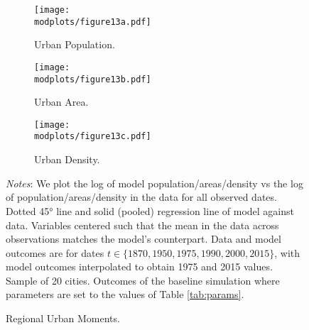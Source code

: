 \documentclass[./20250130-paper.tex]{subfiles}
\begin{document}
\begin{figure}[H]
	\begin{adjustbox}{center}
		\begin{subfigure}{\pthree\textwidth}
			\texttt{[image: \\modplots/figure13a.pdf]}
			\caption{Urban Population.\label{fig:model-data-Lu}}
		\end{subfigure}
		\begin{subfigure}{\pthree\textwidth}
			\texttt{[image: \\modplots/figure13b.pdf]}
			\caption{Urban Area.\label{fig:model-data-area}}
		\end{subfigure}
		\begin{subfigure}{\pthree\textwidth}
			\texttt{[image: \\modplots/figure13c.pdf]}
			\caption{Urban Density.\label{fig:model-data-density}}
		\end{subfigure}
	\end{adjustbox}
	\caption{Regional Urban Moments.\label{fig:model-data}}
	
	{\footnotesize \textit{Notes}: We plot the log of model population/areas/density vs the log of population/areas/density in the data for all observed dates. Dotted 45° line and solid (pooled) regression line of model against data. Variables centered such that the mean in the data across observations matches the model's counterpart. Data and model outcomes are for dates $t \in \{1870, 1950, 1975, 1990, 2000, 2015 \}$, with model outcomes interpolated to obtain 1975 and 2015 values. Sample of 20 cities. Outcomes of the baseline simulation where parameters are set to the values of Table \ref{tab:params}.}
\end{figure}
\end{document}
